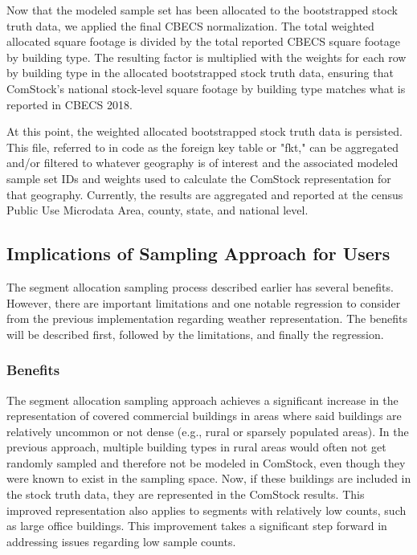 Now that the modeled sample set has been allocated to the bootstrapped stock truth data, we applied the final CBECS normalization. The total weighted allocated square footage is divided by the total reported CBECS square footage by building type. The resulting factor is multiplied with the weights for each row by building type in the allocated bootstrapped stock truth data, ensuring that ComStock's national stock-level square footage by building type matches what is reported in CBECS 2018.

At this point, the weighted allocated bootstrapped stock truth data is persisted. This file, referred to in code as the foreign key table or "fkt," can be aggregated and/or filtered to whatever geography is of interest and the associated modeled sample set IDs and weights used to calculate the ComStock representation for that geography. Currently, the results are aggregated and reported at the census Public Use Microdata Area, county, state, and national level.

\subsection{Implications of Sampling Approach for Users}
The segment allocation sampling process described earlier has several benefits. However, there are important limitations and one notable regression to consider from the previous implementation regarding weather representation. The benefits will be described first, followed by the limitations, and finally the regression.

\subsubsection{Benefits}
The segment allocation sampling approach achieves a significant increase in the representation of covered commercial buildings in areas where said buildings are relatively uncommon or not dense (e.g., rural or sparsely populated areas). In the previous approach, multiple building types in rural areas would often not get randomly sampled and therefore not be modeled in ComStock, even though they were known to exist in the sampling space. Now, if these buildings are included in the stock truth data, they are represented in the ComStock results. This improved representation also applies to segments with relatively low counts, such as large office buildings. This improvement takes a significant step forward in addressing issues regarding low sample counts.

